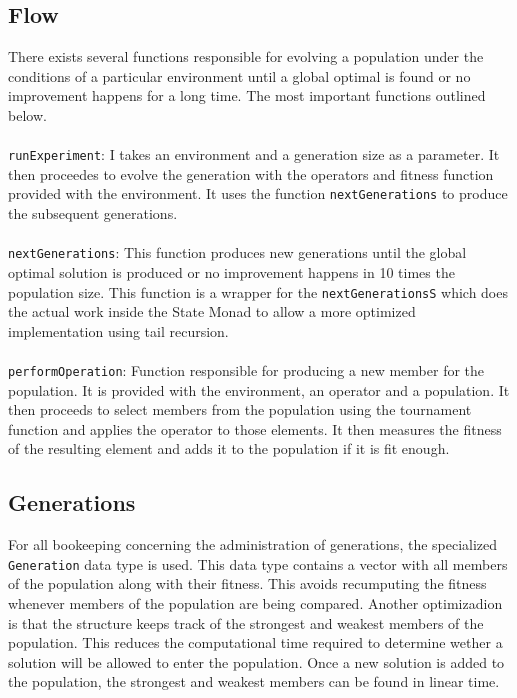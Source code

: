 \documentclass[10pt]{article}
\begin{document}
\subsection{Flow}

There exists several functions responsible for evolving a population under the conditions of a particular environment until a global optimal is found or no improvement happens for a long time. The most important functions outlined below.
\\\\
\verb+runExperiment+: I takes an environment and a generation size as a parameter. It then proceedes to evolve the generation with the operators and fitness function provided with the environment. It uses the function \verb+nextGenerations+ to produce the subsequent generations.
\\\\
\verb+nextGenerations+: This function produces new generations until the global optimal solution is produced or no improvement happens in 10 times the population size. This function is a wrapper for the \verb+nextGenerationsS+ which does the actual work inside the State Monad to allow a more optimized implementation using tail recursion.
\\\\
\verb+performOperation+: Function responsible for producing a new member for the population. It is provided with the environment, an operator and a population. It then proceeds to select members from the population using the tournament function and applies the operator to those elements. It then measures the fitness of the resulting element and adds it to the population if it is fit enough.

\subsection{Generations}

For all bookeeping concerning the administration of generations, the specialized \verb+Generation+ data type is used. This data type contains a vector with all members of the population along with their fitness. This avoids recumputing the fitness whenever members of the population are being compared. Another optimizadion is that the structure keeps track of the strongest and weakest members of the population. This reduces the computational time required to determine wether a solution will be allowed to enter the population. Once a new solution is added to the population, the strongest and weakest members can be found in linear time.
\end{document}
